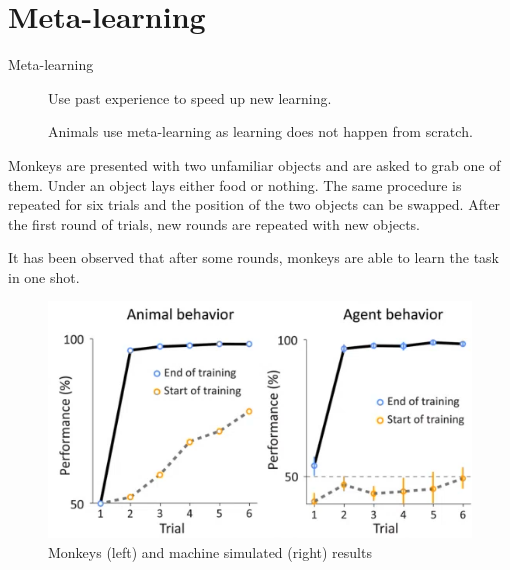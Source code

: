 \section{Meta-learning}

\begin{description}
    \item[Meta-learning] 
        Use past experience to speed up new learning.

        \begin{remark}
            Animals use meta-learning as learning does not happen from scratch.
        \end{remark}
\end{description}

\begin{casestudy}
    Monkeys are presented with two unfamiliar objects and are asked to grab one of them.
    Under an object lays either food or nothing.
    The same procedure is repeated for six trials and the position of the two objects can be swapped.
    After the first round of trials, new rounds are repeated with new objects.

    It has been observed that after some rounds, monkeys are able to learn the task in one shot.

    \begin{figure}[H]
        \centering
        \includegraphics[width=0.4\linewidth]{./img/monkey_meta1.png}
        \caption{Monkeys (left) and machine simulated (right) results}
    \end{figure}
\end{casestudy}

